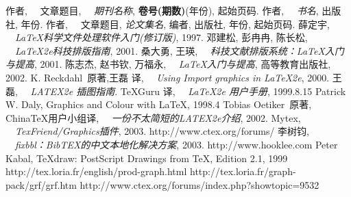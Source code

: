 \begin{thebibliography}{99}
\addtolength{\itemsep}{-0.8 em} %
    作者, ~~文章题目, ~~{\it 期刊名称}, {\bf 卷号(期数)}(年份), 起始页码.
    作者, ~~{\it 书名}, 出版社, 年份.
    作者, ~~文章题目, {\it 论文集名}, 编者, 出版社, 年份, 起始页码.
    薛定宇, ~~{\it \LaTeX 科学文件处理软件入门(修订版)}, 1997.
   邓建松, 彭冉冉, 陈长松, ~~{\it \LaTeX2e科技排版指南}, 2001.
   桑大勇, 王瑛, ~~{\it  科技文献排版系统：\LaTeX 入门与提高}, 2001.
   陈志杰, 赵书钦, 万福永, ~~{\it  \LaTeX 入门与提高}, 高等教育出版社, 2002.
   K. Reckdahl~原著,王磊 译, ~~{\it  Using Import graphics in \LaTeX2e}, 2000.
  王 磊, ~~{\it LATEX2e 插图指南}.
   \TeX Guru 译, ~~{\it \LaTeX2e 用户手册}, 1999.8.15
   Patrick W. Daly, Graphics and Colour with \LaTeX, 1998.4
   Tobias Oetiker~原著, ChinaTeX用户小组译, ~~{\it  一份不太简短的LATEX2e介绍}, 2002.
  Mytex, ~~{\it  TexFriend/Graphics插件}, 2003. http://www.ctex.org/forums/
  李树钧, ~~{\it  fixbbl：BibTEX的中文本地化解决方案}, 2003. http://www.hooklee.com
  Peter Kabal, \TeX draw: PostScript Drawings from \TeX, Edition 2.1, 1999
  http://tex.loria.fr/english/prod-graph.html
  http://tex.loria.fr/graph-pack/grf/grf.htm
   http://www.ctex.org/forums/index.php?showtopic=9532
\end{thebibliography}